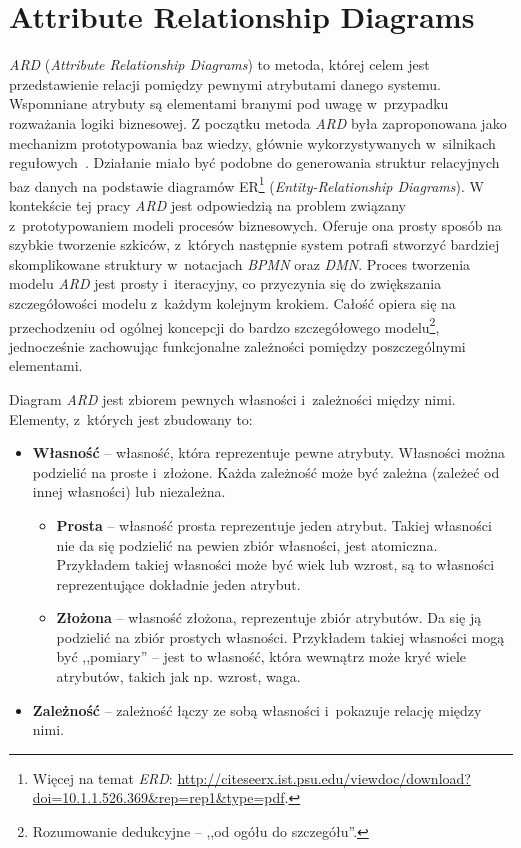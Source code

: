 \section{Attribute Relationship Diagrams}
\label{sec:ard}
\emph{ARD} (\emph{Attribute Relationship Diagrams}) to metoda, której celem jest przedstawienie relacji pomiędzy pewnymi atrybutami danego systemu. Wspomniane atrybuty są elementami branymi pod uwagę w~przypadku rozważania logiki biznesowej. Z początku metoda \emph{ARD} była zaproponowana jako mechanizm prototypowania baz wiedzy, głównie wykorzystywanych w~silnikach regułowych~\cite{ARDFirst}. Działanie miało być podobne do generowania struktur relacyjnych baz danych na podstawie diagramów ER\footnote{Więcej na temat \emph{ERD}: \url{http://citeseerx.ist.psu.edu/viewdoc/download?doi=10.1.1.526.369&rep=rep1&type=pdf}.} (\emph{Entity-Relationship Diagrams}). W kontekście tej pracy \emph{ARD} jest odpowiedzią na problem związany z~prototypowaniem modeli procesów biznesowych. Oferuje ona prosty sposób na szybkie tworzenie szkiców, z~których następnie system potrafi stworzyć bardziej skomplikowane struktury w~notacjach \emph{BPMN} oraz \emph{DMN}. Proces tworzenia modelu \emph{ARD} jest prosty i~iteracyjny, co przyczynia się do zwiększania szczegółowości modelu z~każdym kolejnym krokiem. Całość opiera się na przechodzeniu od ogólnej koncepcji do bardzo szczegółowego modelu\footnote{Rozumowanie dedukcyjne -- ,,od ogółu do szczegółu''.}, jednocześnie zachowując funkcjonalne zależności pomiędzy poszczególnymi elementami.

Diagram \emph{ARD} jest zbiorem pewnych własności i~zależności między nimi. Elementy, z~których jest zbudowany to:
\begin{itemize}
    \item \textbf{Własność} -- własność, która reprezentuje pewne atrybuty. Własności można podzielić na proste i~złożone. Każda zależność może być zależna (zależeć od innej własności) lub niezależna.
        \begin{itemize}
            \item \textbf{Prosta} -- własność prosta reprezentuje jeden atrybut. Takiej własności nie da się podzielić na pewien zbiór własności, jest atomiczna. Przykładem takiej własności może być wiek lub wzrost, są to własności reprezentujące dokładnie jeden atrybut.
            \item \textbf{Złożona} -- własność złożona, reprezentuje zbiór atrybutów. Da się ją podzielić na zbiór prostych własności. Przykładem takiej własności mogą być ,,pomiary'' -- jest to własność, która wewnątrz może kryć wiele atrybutów, takich jak np. wzrost, waga.  
        \end{itemize} 
    \item \textbf{Zależność} -- zależność łączy ze sobą własności i~pokazuje relację między nimi. 
\end{itemize}

